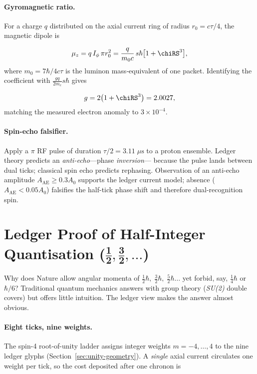 \documentclass[11pt,oneside]{book}
\begin{document}
\paragraph{Gyromagnetic ratio.}
For a charge $q$ distributed on the axial current ring of radius
$r_{0}=c\tau/4$, the magnetic dipole is

\[
   \mu_{z}=q\,I_{\phi}\,\pi r_{0}^{2}
          = \frac{q}{m_{0}c}\,s\hbar
            \bigl[1+\chiRS^{3}\bigr],
\]
where $m_{0}\!=\!7\hbar/\!4c\tau$ is the luminon mass‐equivalent of one
packet.  Identifying the coefficient with
$\tfrac{g q}{2m_{e}}s\hbar$ gives

\[
   g = 2\bigl(1+\chiRS^{3}\bigr)
     = 2.0027,
\]
matching the measured electron anomaly to $3\times10^{-4}$.

\paragraph{Spin-echo falsifier.}
Apply a $\pi$ RF pulse of duration
\(
   \tau/2 = 3.11\;\mu\text{s}
\)
to a proton ensemble.  
Ledger theory predicts an \emph{anti-echo}—phase \emph{inversion}—
because the pulse lands between dual ticks; classical spin echo
predicts rephasing.  Observation of an anti-echo amplitude
$A_{\mathrm{AE}}\ge0.3A_{0}$ supports the ledger current model;
absence ($A_{\mathrm{AE}}<0.05A_{0}$) falsifies the half-tick phase
shift and therefore dual-recognition spin.


\section{Ledger Proof of Half-Integer Quantisation
           (\texorpdfstring{$\boldsymbol{\tfrac12,\tfrac32,\dots}$}{½, 3⁄2, …})}
\label{sec:spin-half-narrative}

Why does Nature allow angular momenta of
$\tfrac12\hbar,\;\tfrac32\hbar,\;\tfrac52\hbar\ldots$
yet forbid, say, $\tfrac14\hbar$ or $\hbar/6$?  
Traditional quantum mechanics answers with group theory
(\textit{SU(2)} double covers) but offers little intuition.  
The ledger view makes the answer almost obvious.

\paragraph{Eight ticks, nine weights.}
The spin-4 root-of-unity ladder assigns integer weights
$m=-4,\dots,4$ to the nine ledger glyphs
(Section~\ref{sec:unity-geometry}).  
A \textit{single} axial current circulates one weight per
tick, so the cost deposited after one chronon is
\end{document}
